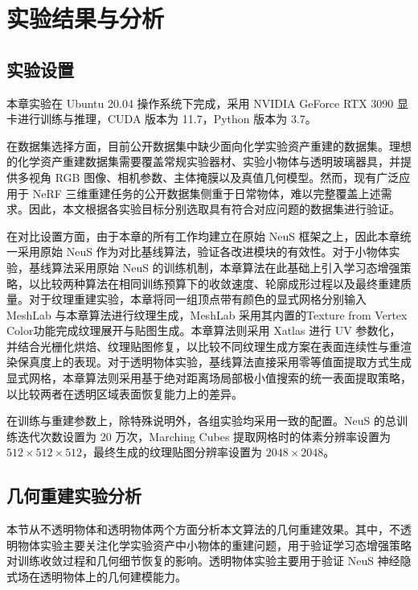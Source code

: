 \section{实验结果与分析}

\subsection{实验设置}

本章实验在 Ubuntu 20.04 操作系统下完成，采用 NVIDIA GeForce RTX 3090 显卡进行训练与推理，CUDA 版本为 11.7，Python 版本为 3.7。

在数据集选择方面，目前公开数据集中缺少面向化学实验资产重建的数据集。理想的化学资产重建数据集需要覆盖常规实验器材、实验小物体与透明玻璃器具，并提供多视角 RGB 图像、相机参数、主体掩膜以及真值几何模型。然而，现有广泛应用于 NeRF 三维重建任务的公开数据集\cite{mildenhall2020nerf,jensen2014large,knapitsch2017tanks,yao2020blendedmvs}侧重于日常物体，难以完整覆盖上述需求。因此，本文根据各实验目标分别选取具有符合对应问题的数据集进行验证。

在对比设置方面，由于本章的所有工作均建立在原始 NeuS 框架之上，因此本章统一采用原始 NeuS 作为对比基线算法，验证各改进模块的有效性。对于小物体实验，基线算法采用原始 NeuS 的训练机制，本章算法在此基础上引入学习态增强策略，以比较两种算法在相同训练预算下的收敛速度、轮廓成形过程以及最终重建质量。对于纹理重建实验，本章将同一组顶点带有颜色的显式网格分别输入 MeshLab \cite{cignoni2008meshlab} 与本章算法进行纹理生成，MeshLab 采用其内置的Texture from Vertex Color功能完成纹理展开与贴图生成。本章算法则采用 Xatlas 进行 UV 参数化，并结合光栅化烘焙、纹理贴图修复，以比较不同纹理生成方案在表面连续性与重渲染保真度上的表现。对于透明物体实验，基线算法直接采用零等值面提取方式生成显式网格，本章算法则采用基于绝对距离场局部极小值搜索的统一表面提取策略，以比较两者在透明区域表面恢复能力上的差异。

在训练与重建参数上，除特殊说明外，各组实验均采用一致的配置。NeuS 的总训练迭代次数设置为 20 万次，Marching Cubes 提取网格时的体素分辨率设置为 $512 \times 512 \times 512$，最终生成的纹理贴图分辨率设置为 $2048 \times 2048$。

\subsection{几何重建实验分析}

本节从不透明物体和透明物体两个方面分析本文算法的几何重建效果。其中，不透明物体实验主要关注化学实验资产中小物体的重建问题，用于验证学习态增强策略对训练收敛过程和几何细节恢复的影响。透明物体实验主要用于验证 NeuS 神经隐式场在透明物体上的几何建模能力。


